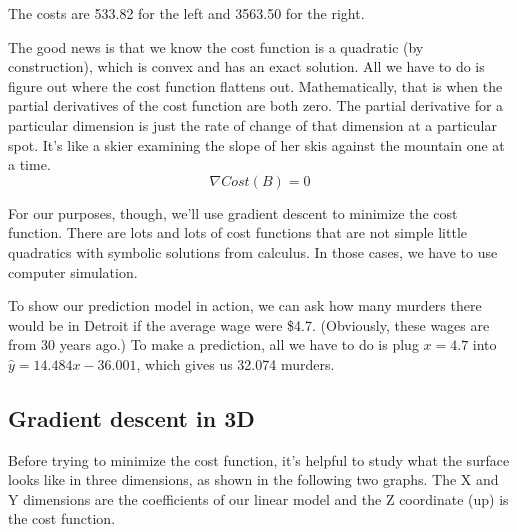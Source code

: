 \documentclass[titlepage]{tufte-book}
\begin{document}
\begin{fullwidth}
\noindent The costs are 533.82 for the left and 3563.50 for the right.

The good news is that we know the cost function is a quadratic (by construction), which is convex and has an exact solution. All we have to do is figure out where the cost function flattens out. Mathematically, that is when the partial derivatives of the cost function are both zero. The partial derivative for a particular dimension is just the rate of change of that dimension at a particular spot. It's like a skier examining the slope of her skis against the mountain one at a time.
\[\tag{Analytic solution to optimization}
\nabla Cost(B) = 0
\]

\noindent For our purposes, though, we'll use gradient descent to minimize the cost function. There are lots and lots of cost functions that are not simple little quadratics with symbolic solutions from calculus. In those cases, we have to use computer simulation.

To show our prediction model in action, we can ask how many murders  there would be in Detroit if the average wage were \$4.7. (Obviously, these wages are from 30 years ago.) To make a prediction, all we have to do is plug $x=4.7$ into $\hat{y} = 14.484 x - 36.001$, which gives us 32.074 murders.

\subsection{Gradient descent in 3D}

Before trying to minimize the cost function, it's helpful to study what the surface looks like in three dimensions, as shown in the following two graphs. The X and Y dimensions are the coefficients of our linear model and the Z coordinate (up) is the cost function.


\end{fullwidth}
\end{document}
